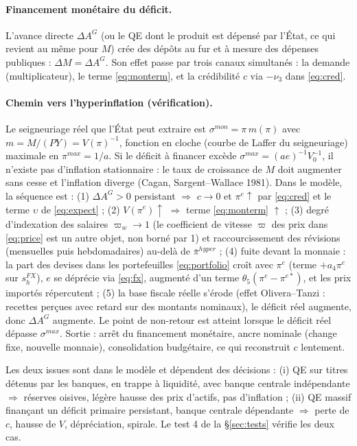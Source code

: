 \documentclass[11pt,a4paper]{article}
\begin{document}
\paragraph{Financement monétaire du déficit.} L'avance directe $\Delta A^G$ (ou le QE dont le produit est dépensé par l'État, ce qui revient au même pour $M$) crée des dépôts au fur et à mesure des dépenses publiques : $\Delta M = \Delta A^G$. Son effet passe par trois canaux simultanés : la demande (multiplicateur), le terme \eqref{eq:monterm}, et la crédibilité $c$ via $-\nu_3$ dans \eqref{eq:cred}.

\paragraph{Chemin vers l'hyperinflation (vérification).} Le seigneuriage réel que l'État peut extraire est $\sigma^{mon} = \pi\, m(\pi)$ avec $m = M/(PY) = V(\pi)^{-1}$, fonction en cloche (courbe de Laffer du seigneuriage) maximale en $\pi^{max} = 1/a$. Si le déficit à financer excède $\sigma^{max} = (ae)^{-1}V_0^{-1}$, il n'existe pas d'inflation stationnaire : le taux de croissance de $M$ doit augmenter sans cesse et l'inflation diverge (Cagan, Sargent--Wallace 1981). Dans le modèle, la séquence est : (1) $\Delta A^G > 0$ persistant $\Rightarrow$ $c \to 0$ et $\pi^e \uparrow$ par \eqref{eq:cred} et le terme $\upsilon$ de \eqref{eq:expect} ; (2) $V(\pi^e)\uparrow$ $\Rightarrow$ terme \eqref{eq:monterm} $\uparrow$ ; (3) degré d'indexation des salaires $\varpi_w \to 1$ (le coefficient de vitesse $\varpi$ des prix dans \eqref{eq:price} est un autre objet, non borné par 1) et raccourcissement des révisions (mensuelles puis hebdomadaires) au-delà de $\bar\pi^{hyper}$ ; (4) fuite devant la monnaie : la part des devises dans les portefeuilles \eqref{eq:portfolio} croît avec $\pi^e$ (terme $+a_4 \pi^e$ sur $s^{FX}_h$), $e$ se déprécie via \eqref{eq:fx}, augmenté d'un terme $\theta_5(\pi^e - \pi^{e\ast})$, et les prix importés répercutent ; (5) la base fiscale réelle s'érode (effet Olivera--Tanzi : recettes perçues avec retard sur des montants nominaux), le déficit réel augmente, donc $\Delta A^G$ augmente. Le point de non-retour est atteint lorsque le déficit réel dépasse $\sigma^{max}$. Sortie : arrêt du financement monétaire, ancre nominale (change fixe, nouvelle monnaie), consolidation budgétaire, ce qui reconstruit $c$ lentement.

\begin{design}
Les deux issues sont dans le modèle et dépendent des décisions : (i) QE sur titres détenus par les banques, en trappe à liquidité, avec banque centrale indépendante $\Rightarrow$ réserves oisives, légère hausse des prix d'actifs, pas d'inflation ; (ii) QE massif finançant un déficit primaire persistant, banque centrale dépendante $\Rightarrow$ perte de $c$, hausse de $V$, dépréciation, spirale. Le test 4 de la \S\ref{sec:tests} vérifie les deux cas.
\end{design}
\end{document}
